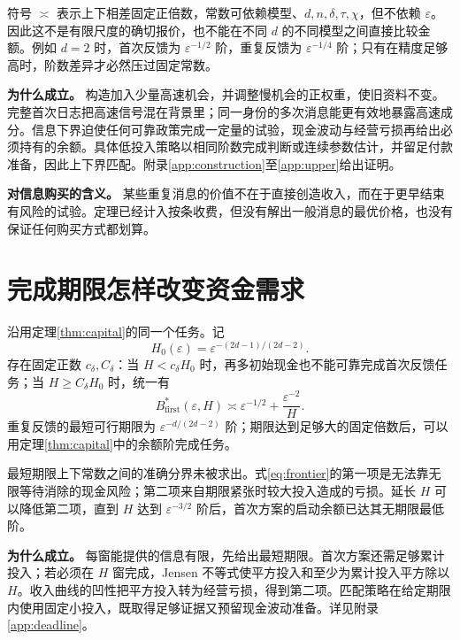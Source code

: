符号 $\asymp$ 表示上下相差固定正倍数，常数可依赖模型、$d,n,\delta,\tau,\chi$，但不依赖 $\varepsilon$。因此这不是有限尺度的确切报价，也不能在不同 $d$ 的不同模型之间直接比较金额。例如 $d=2$ 时，首次反馈为 $\varepsilon^{-1/2}$ 阶，重复反馈为 $\varepsilon^{-1/4}$ 阶；只有在精度足够高时，阶数差异才必然压过固定常数。

\noindent\textbf{为什么成立。}
构造加入少量高速机会，并调整慢机会的正权重，使旧资料不变。完整首次日志把高速信号混在背景里；同一身份的多次消息能更有效地暴露高速成分。信息下界迫使任何可靠政策完成一定量的试验，现金波动与经营亏损再给出必须持有的余额。具体低投入策略以相同阶数完成判断或连续参数估计，并留足付款准备，因此上下界匹配。附录\ref{app:construction}至\ref{app:upper}给出证明。

\noindent\textbf{对信息购买的含义。}
某些重复消息的价值不在于直接创造收入，而在于更早结束有风险的试验。定理已经计入按条收费，但没有解出一般消息的最优价格，也没有保证任何购买方式都划算。

\clearpage
\section{完成期限怎样改变资金需求}
\begin{theorem}[首次反馈的资金与期限关系]\label{thm:deadline}
沿用定理\ref{thm:capital}的同一个任务。记
\[
 H_0(\varepsilon)=\varepsilon^{-(2d-1)/(2d-2)}.
\]
存在固定正数 $c_\delta,C_\delta$：当 $H<c_\delta H_0$ 时，再多初始现金也不能可靠完成首次反馈任务；当 $H\geq C_\delta H_0$ 时，统一有
\begin{equation}\label{eq:frontier}
 B^*_{\mathrm{first}}(\varepsilon,H)
 \asymp\varepsilon^{-1/2}+\frac{\varepsilon^{-2}}H.
\end{equation}
重复反馈的最短可行期限为 $\varepsilon^{-d/(2d-2)}$ 阶；期限达到足够大的固定倍数后，可以用定理\ref{thm:capital}中的余额阶完成任务。
\end{theorem}

最短期限上下常数之间的准确分界未被求出。式\eqref{eq:frontier}的第一项是无法靠无限等待消除的现金风险；第二项来自期限紧张时较大投入造成的亏损。延长 $H$ 可以降低第二项，直到 $H$ 达到 $\varepsilon^{-3/2}$ 阶后，首次方案的启动余额已达其无期限最低阶。

\noindent\textbf{为什么成立。}
每窗能提供的信息有限，先给出最短期限。首次方案还需足够累计投入；若必须在 $H$ 窗完成，Jensen 不等式使平方投入和至少为累计投入平方除以 $H$。收入曲线的凹性把平方投入转为经营亏损，得到第二项。匹配策略在给定期限内使用固定小投入，既取得足够证据又预留现金波动准备。详见附录\ref{app:deadline}。

